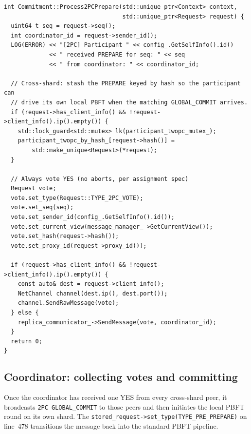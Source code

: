 \documentclass[11pt]{article}
\begin{document}
\begin{lstlisting}[style=cppstyle,caption={\texttt{platform/consensus/ordering/pbft/commitment.cpp} -- \texttt{Process2PCPrepare}: stash PREPARE, send VOTE back to coordinator.}]
int Commitment::Process2PCPrepare(std::unique_ptr<Context> context,
                                  std::unique_ptr<Request> request) {
  uint64_t seq = request->seq();
  int coordinator_id = request->sender_id();
  LOG(ERROR) << "[2PC] Participant " << config_.GetSelfInfo().id()
             << " received PREPARE for seq: " << seq
             << " from coordinator: " << coordinator_id;

  // Cross-shard: stash the PREPARE keyed by hash so the participant can
  // drive its own local PBFT when the matching GLOBAL_COMMIT arrives.
  if (request->has_client_info() && !request->client_info().ip().empty()) {
    std::lock_guard<std::mutex> lk(participant_twopc_mutex_);
    participant_twopc_by_hash_[request->hash()] =
        std::make_unique<Request>(*request);
  }

  // Always vote YES (no aborts, per assignment spec)
  Request vote;
  vote.set_type(Request::TYPE_2PC_VOTE);
  vote.set_seq(seq);
  vote.set_sender_id(config_.GetSelfInfo().id());
  vote.set_current_view(message_manager_->GetCurrentView());
  vote.set_hash(request->hash());
  vote.set_proxy_id(request->proxy_id());

  if (request->has_client_info() && !request->client_info().ip().empty()) {
    const auto& dest = request->client_info();
    NetChannel channel(dest.ip(), dest.port());
    channel.SendRawMessage(vote);
  } else {
    replica_communicator_->SendMessage(vote, coordinator_id);
  }
  return 0;
}
\end{lstlisting}

\subsection{Coordinator: collecting votes and committing}

Once the coordinator has received one YES from every cross-shard peer, it
broadcasts \texttt{2PC GLOBAL\_COMMIT} to those peers and then initiates
the local PBFT round on its own shard. The
\texttt{stored\_request->set\_type(TYPE\_PRE\_PREPARE)} on line~478 transitions
the message back into the standard PBFT pipeline.
\end{document}
